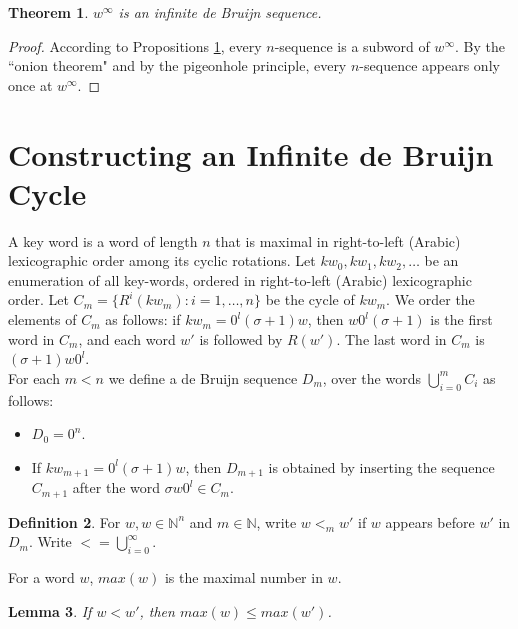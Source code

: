 \documentclass{article}
\newtheorem{theorem}{Theorem}
\newtheorem{lemma}[theorem]{Lemma}
\theoremstyle{definition}
\newtheorem{definition}[theorem]{Definition}
\newcommand{\N}{{\mathbb{N}}}
\begin{document}
\begin{theorem}
	$w^\infty$ is an infinite de Bruijn sequence.
\end{theorem}

\begin{proof}
	According to Propositions \ref{}, every $n$-sequence is a subword of $w^\infty$. By the ``onion theorem" and by the pigeonhole principle, every $n$-sequence appears only once at $w^\infty$.
\end{proof}


\section{Constructing an Infinite de Bruijn Cycle}

A key word is a word of length $n$ that is maximal in right-to-left (Arabic) lexicographic order among its cyclic rotations. Let $kw_0,kw_1,kw_2,\dots$ be an enumeration of all key-words, ordered in right-to-left (Arabic) lexicographic order. Let $C_m=\{R^i(kw_m): i=1,\dots,n\}$ be the cycle of $kw_m$. We order the elements of $C_m$ as follows:  if $kw_m=0^l(\sigma+1)w$, then $w0^l(\sigma+1)$ is the first word in $C_m$, and each word $w'$ is followed by $R(w')$. The last word in $C_m$ is $(\sigma+1)w0^l$.\\

For each $m<n$ we define a de Bruijn sequence $D_m$, over the words $\bigcup_{i=0}^m C_i$ as follows: 
\begin{itemize}
	\item $D_0=0^n$.
	\item If $kw_{m+1}=0^l(\sigma+1)w$, then $D_{m+1}$ is obtained by inserting the sequence $C_{m+1}$ after the word $\sigma w 0^l\in C_m$.
\end{itemize}


\begin{definition}
	For $w,w\in \N^n$ and $m\in \N$, write $w<_m w'$ if $w$ appears before $w'$ in $D_m$. Write $<=\bigcup_{i=0}^\infty$.
\end{definition}

For a word $w$, $max(w)$ is the maximal number in $w$.

\begin{lemma}
	If $w<w'$, then $max(w)\leq max(w')$.
\end{lemma}
\end{document}
